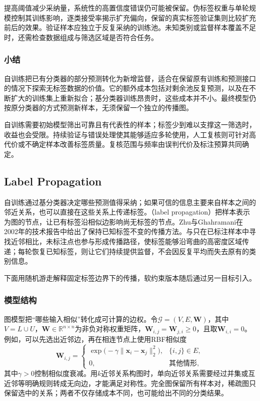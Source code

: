 提高阈值减少采纳量，系统性的高置信度错误仍可能被保留。伪标签权重与单轮规模控制其训练影响，逐类接受率揭示扩充偏向，保留的真实标签验证集则比较扩充前后的效果。验证样本应独立于反复采纳的训练池。未知类别或监督样本覆盖不足时，还需检查数据组成与筛选区域是否符合任务。

\subsubsection{小结}
\label{sec:classification-self-training-summary}

自训练把已有分类器的部分预测转化为新增监督，适合在保留原有训练和预测接口的情况下探索无标签数据的价值。它的额外成本包括对剩余池反复预测，以及在不断扩大的训练集上重新拟合；基分类器训练昂贵时，这些成本并不小。最终模型仍按原分类器的方式预测新样本，无须保留一个独立的传播图。

自训练需要初始模型筛出可靠且有代表性的样本；标签少到难以支撑这一筛选时，收益也会受限。持续验证与错误处理使其能够适应多轮使用，人工复核则可针对高代价或不确定样本改善标签质量。复核范围与频率由误判代价及标注预算共同确定。

\subsection{Label Propagation}
\label{sec:classification-label-propagation}

自训练通过基分类器决定哪些预测值得采纳；如果可信的信息主要来自样本之间的邻近关系，也可以直接在这些关系上传递标签。（label propagation）把样本表示为图的节点，让已有标签沿相似边影响尚无标签的节点。Zhu与Ghahramani在2002年的技术报告中给出了保持已知标签不变的传播方法。与只在已标注样本中寻找近邻相比，未标注点也参与形成传播路径，使标签能够沿弯曲的高密度区域传递；每轮恢复已知标签，则让它们持续提供监督，不会因反复平均而失去原有的类别信息。

下面用随机游走解释固定标签边界下的传播，软约束版本随后通过另一目标引入。

\subsubsection{模型结构}
\label{sec:classification-label-propagation-structure}

图模型把“哪些输入相似”转化成可计算的边权。令$\mathcal{G}=(V,E,\bm{W})$，其中$V=L\cup U$，$\bm{W}\in\mathbb{R}^{n\times n}$为非负对称权重矩阵，$\bm{W}_{i,j}=\bm{W}_{j,i}\geq0$，且取$\bm{W}_{i,i}=0$。例如，可以先选出近邻边，再在相连节点上使用RBF相似度
\begin{equation}
  \label{eq:classification-label-propagation-weights}
  \bm{W}_{i,j}=
  \begin{cases}
    \exp\bigl(-\gamma\lVert\bm{x}_i-\bm{x}_j\rVert_2^2\bigr),
      & \{i,j\}\in E,\\
    0, & \text{其他情形},
  \end{cases}
\end{equation}
其中$\gamma>0$控制相似度衰减。用$k$近邻关系构图时，单向近邻关系需要经过并集或互近邻等明确规则转成无向边，才能满足对称性。完全图保留所有样本对，稀疏图只保留选中的关系；两者不仅存储成本不同，也可能给出不同的分类结果。

